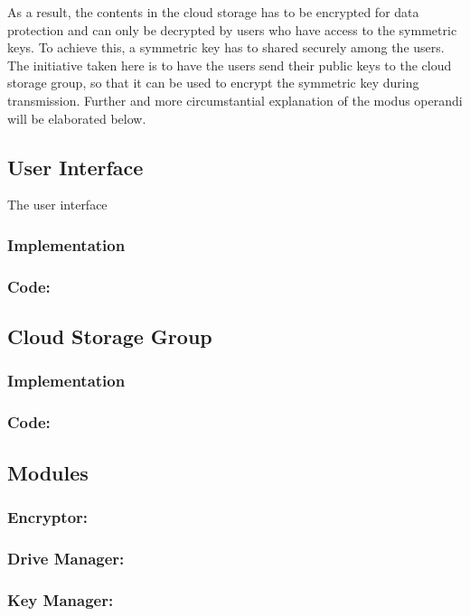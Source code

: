 \documentclass[12pt]{article}
\begin{document}
As a result, the contents in the cloud storage has to be encrypted for data protection and can only be decrypted by users who have access to the symmetric keys. To achieve this, a symmetric key has to shared securely among the users. The initiative taken here is to have the users send their public keys to the cloud storage group, so that it can be used to encrypt the symmetric key during transmission. Further and more circumstantial explanation of the modus operandi will be elaborated below.
\subsection*{User Interface}
The user interface 
\subsubsection*{Implementation}
\subsubsection*{Code:}

\newpage
\subsection*{Cloud Storage Group}
\subsubsection*{Implementation}
\subsubsection*{Code:}

\newpage
\subsection*{Modules}
\subsubsection*{Encryptor:}
\subsubsection*{Drive Manager:}
\subsubsection*{Key Manager:}
\end{document}
